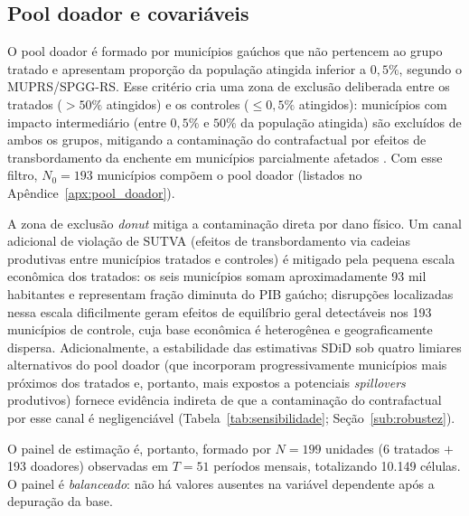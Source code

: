 \documentclass[a4paper,12pt]{article}
\begin{document}
\subsection{Pool doador e covariáveis}
\label{sub:pool}

O pool doador é formado por municípios gaúchos que não pertencem ao grupo tratado e
apresentam proporção da população atingida inferior a $0{,}5\%$, segundo o MUPRS/SPGG-RS.
Esse critério cria uma zona de exclusão deliberada entre os tratados
($>50\%$ atingidos) e os controles ($\leq 0{,}5\%$ atingidos): municípios com impacto
intermediário (entre $0{,}5\%$ e $50\%$ da população atingida) são excluídos de
ambos os grupos, mitigando a contaminação do contrafactual por efeitos de transbordamento
da enchente em municípios parcialmente afetados \cite{abadie2021}. Com esse filtro,
$N_0 = 193$ municípios compõem o pool doador
(listados no Apêndice~\ref{apx:pool_doador}).

A zona de exclusão \textit{donut} mitiga a contaminação direta por dano físico. Um canal
adicional de violação de SUTVA (efeitos de transbordamento via cadeias produtivas entre
municípios tratados e controles) é mitigado pela pequena escala econômica dos tratados:
os seis municípios somam aproximadamente 93 mil habitantes e representam fração diminuta
do PIB gaúcho; disrupções localizadas nessa escala dificilmente geram efeitos de
equilíbrio geral detectáveis nos 193 municípios de controle, cuja base econômica é
heterogênea e geograficamente dispersa. Adicionalmente, a estabilidade das estimativas
SDiD sob quatro limiares alternativos do pool doador (que incorporam progressivamente
municípios mais próximos dos tratados e, portanto, mais expostos a potenciais
\textit{spillovers} produtivos) fornece evidência indireta de que a contaminação do
contrafactual por esse canal é negligenciável
(Tabela~\ref{tab:sensibilidade}; Seção~\ref{sub:robustez}).

O painel de estimação é, portanto, formado por $N = 199$ unidades (6 tratados $+$
193 doadores) observadas em $T = 51$ períodos mensais, totalizando 10.149 células.
O painel é \emph{balanceado}: não há valores ausentes na variável dependente após a
depuração da base.
\end{document}
